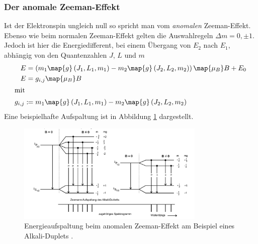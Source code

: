 \subsubsection{Der anomale Zeeman-Effekt}
Ist der Elektronspin ungleich null so spricht man vom \emph{anomalen} Zeeman-Effekt.
Ebenso wie beim normalen Zeeman-Effekt gelten die Auswahlregeln $\Delta m=0, \pm 1$.
Jedoch ist hier die Energiedifferent, bei einem Übergang von $E_2$ nach $E_1$,
abhängig von den Quantenzahlen $J$, $L$ und $m$
\begin{align}
  E&=\left(m_1\map{g}\left(J_1,L_1,m_1\right)-m_2\map{g}\left(J_2,L_2,m_2\right)\right)\map{\mu_B}B+E_0 \notag \\
  E&=g_{i,j}\map{\mu_B}B \label{eq:energie_anomale_zemman}\\
\shortintertext{mit}
g_{i,j}:\!\!&=m_1\map{g}\left(J_1,L_1,m_1\right)-m_2\map{g}\left(J_2,L_2,m_2\right)\label{eq: faktor_gij}
\end{align}
Eine beispielhafte Aufspaltung ist in Abbildung \ref{fig: energie_aufspaltung_annomaler} dargestellt.

\begin{figure}[h]
  \centering
  \includegraphics[width=0.8\textwidth]{pics/energieaufspaltung_annomaler.png}
  \caption{Energieaufspaltung beim anomalen Zeeman-Effekt am Beispiel eines Alkali-Duplets \cite{anleitung27}.}
  \label{fig: energie_aufspaltung_annomaler}
\end{figure}
